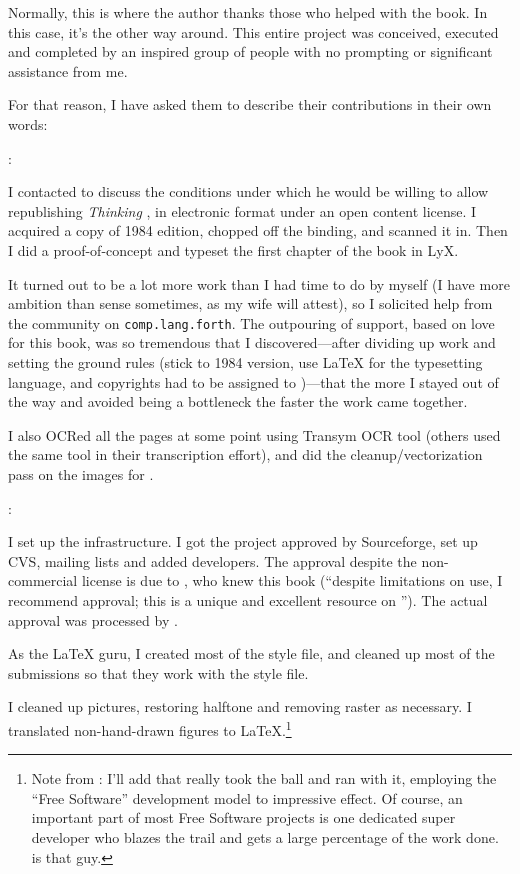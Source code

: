 Normally, this is where the author thanks those who helped with the
book. In this case, it's the other way around. This entire project was
conceived, executed and completed by an inspired group of people with
no prompting or significant assistance from me.

For that reason, I have asked them to describe their contributions in
their own words:

\begin{interview}
:

\begin{tfquot}
I contacted  to discuss the conditions under which
he would be willing to allow republishing \emph{Thinking \Forth}, in
electronic format under an open content license. I acquired a copy of
1984 edition, chopped off the binding, and scanned it in. Then I did a
proof-of-concept and typeset the first chapter of the book in LyX.

It turned out to be a lot more work than I had time to do by myself (I
have more ambition than sense sometimes, as my wife will attest), so I
solicited help from the \Forth{} community on {\tt comp.lang.forth}. The
outpouring of support, based on love for this book, was so tremendous
that I discovered---after dividing up work and setting the ground
rules (stick to 1984 version, use \LaTeX{} for the typesetting
language, and copyrights had to be assigned to )---that the more I stayed out of the way and avoided being a
bottleneck the faster the work came together.

I also OCRed all the pages at some point using Transym OCR tool
(others used the same tool in their transcription effort), and did the
cleanup/vectorization pass on the images for .
\end{tfquot}
\end{interview}
\begin{interview*}
:
\begin{tfquot}
I set up the infrastructure. I got the project approved by
Sourceforge, set up CVS, mailing lists and added developers. The
approval despite the non-commercial license is due to , who knew this book (``despite limitations on use, I recommend
approval; this is a unique and excellent resource on \Forth{}''). The
actual approval was processed by .

As the \LaTeX{} guru, I created most of the style file, and cleaned up
most of the submissions so that they work with the style file.

I cleaned up pictures, restoring halftone and removing raster
as necessary. I translated non-hand-drawn figures to
\LaTeX{}.\footnote{Note from : I'll add that
 really took the ball and ran with it, employing the
``Free Software'' development model to impressive effect.  Of course, an
important part of most Free Software projects is one dedicated super
developer who blazes the trail and gets a large percentage of the work
done.   is that guy.}
\end{tfquot}
\end{interview*}

